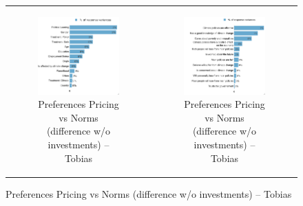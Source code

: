 \documentclass{article}
\begin{document}
\begin{figure}[h!]
\begin{center}
	\caption{Pricing vs. Norms 'ed}
	\caption*{Variance decomposition LMG}
	\setlength\extrarowheight{-1pt}
	\begin{tabular}{cc}
		\begin{subfigure}{0.5\textwidth}
		\caption{Preferences Pricing vs Norms (difference w/o investments) -- Tobias}
			\includegraphics[width=\textwidth]{lmg_pref_pricing_norms_diff_V1_socio_non_standardized}
		\end{subfigure}&
		\begin{subfigure}{0.5\textwidth}
		\caption{Preferences Pricing vs Norms (difference w/o investments) -- Tobias}
			\includegraphics[width=\textwidth]{lmg_pref_pricing_norms_diff_V1_indices_non_standardized}
		\end{subfigure}\\
	\end{tabular}


\end{center}
\end{figure}
\end{document}
